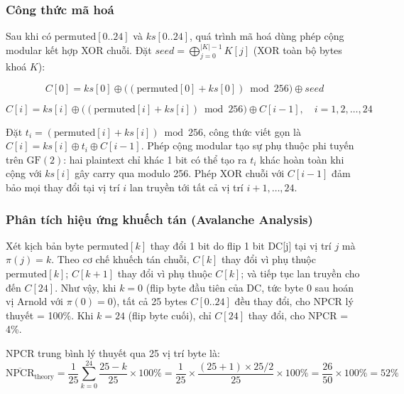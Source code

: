 \subsubsection{Công thức mã hoá}

Sau khi có $\text{permuted}[0..24]$ và $ks[0..24]$, quá trình mã hoá dùng phép cộng modular kết hợp XOR chuỗi. Đặt $seed = \bigoplus_{j=0}^{|K|-1} K[j]$ (XOR toàn bộ bytes khoá $K$):

\begin{equation}
C[0] = ks[0] \oplus \bigl((\text{permuted}[0] + ks[0]) \bmod 256\bigr) \oplus seed
\label{eq:c0}
\end{equation}

\begin{equation}
C[i] = ks[i] \oplus \bigl((\text{permuted}[i] + ks[i]) \bmod 256\bigr) \oplus C[i-1], \quad i = 1, 2, \ldots, 24
\label{eq:chained_diffusion}
\end{equation}

Đặt $t_i = (\text{permuted}[i] + ks[i]) \bmod 256$, công thức viết gọn là $C[i] = ks[i] \oplus t_i \oplus C[i-1]$. Phép cộng modular tạo sự phụ thuộc phi tuyến trên $\text{GF}(2)$: hai plaintext chỉ khác 1 bit có thể tạo ra $t_i$ khác hoàn toàn khi cộng với $ks[i]$ gây carry qua modulo 256. Phép XOR chuỗi với $C[i-1]$ đảm bảo mọi thay đổi tại vị trí $i$ lan truyền tới tất cả vị trí $i+1, \ldots, 24$.

\subsubsection{Phân tích hiệu ứng khuếch tán (Avalanche Analysis)}

Xét kịch bản byte $\text{permuted}[k]$ thay đổi 1 bit do flip 1 bit DC[j] tại vị trí $j$ mà $\pi(j) = k$. Theo cơ chế khuếch tán chuỗi, $C[k]$ thay đổi vì phụ thuộc $\text{permuted}[k]$; $C[k+1]$ thay đổi vì phụ thuộc $C[k]$; và tiếp tục lan truyền cho đến $C[24]$. Như vậy, khi $k = 0$ (flip byte đầu tiên của DC, tức byte 0 sau hoán vị Arnold với $\pi(0) = 0$), tất cả 25 bytes $C[0..24]$ đều thay đổi, cho NPCR lý thuyết = 100\%. Khi $k = 24$ (flip byte cuối), chỉ $C[24]$ thay đổi, cho NPCR = 4\%.

NPCR trung bình lý thuyết qua 25 vị trí byte là:
\begin{equation}
\overline{\text{NPCR}}_{\text{theory}} = \frac{1}{25}\sum_{k=0}^{24} \frac{25 - k}{25} \times 100\%
= \frac{1}{25} \times \frac{(25+1) \times 25/2}{25} \times 100\% = \frac{26}{50} \times 100\% = 52\%
\end{equation}

